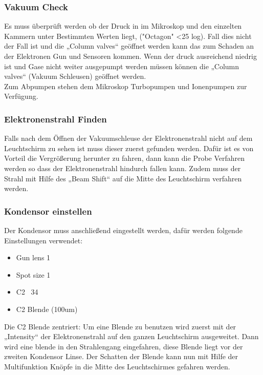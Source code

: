 \subsubsection{Vakuum Check}
Es muss überprüft werden ob der Druck in im Mikroskop und den einzelten Kammern unter Bestimmten Werten liegt, ("Octagon" <25 log). Fall dies nicht der Fall ist und die „Column valves“ geöffnet werden kann das zum Schaden an der Elektronen Gun und Sensoren kommen. Wenn der druck ausreichend niedrig ist und Gase nicht weiter ausgepumpt werden müssen können die „Column valves“ (Vakuum Schleusen) geöffnet werden.\\
Zum Abpumpen stehen dem Mikroskop Turbopumpen und  Ionenpumpen zur Verfügung.

\subsubsection{Elektronenstrahl Finden}
Falls nach dem Öffnen der Vakuumschleuse der Elektronenstrahl nicht auf dem Leuchtschirm zu sehen ist muss dieser zuerst gefunden werden. Dafür ist es von Vorteil die Vergrößerung herunter zu fahren, dann kann die Probe Verfahren werden so dass der Elektronenstrahl hindurch fallen kann. Zudem muss der Strahl mit Hilfe des „Beam Shift“ auf die Mitte des Leuchtschirm verfahren werden.

\subsubsection{Kondensor einstellen}
Der Kondensor muss anschließend eingestellt werden, dafür werden folgende Einstellungen verwendet:
\begin{itemize}
  \item Gun lens 1
  \item Spot size 1
  \item C2 ~34%
  \item C2 Blende (100um)
\end{itemize}
Die C2 Blende zentriert: Um eine Blende zu benutzen wird zuerst mit der „Intensity“ der Elektronenstrahl auf den ganzen Leuchtschirm ausgeweitet. Dann wird eine blende in den Strahlengang eingefahren, diese Blende liegt vor der zweiten Kondensor Linse.  Der Schatten der Blende kann nun mit Hilfe der Multifunktion Knöpfe in die Mitte des Leuchtschirmes gefahren werden.

